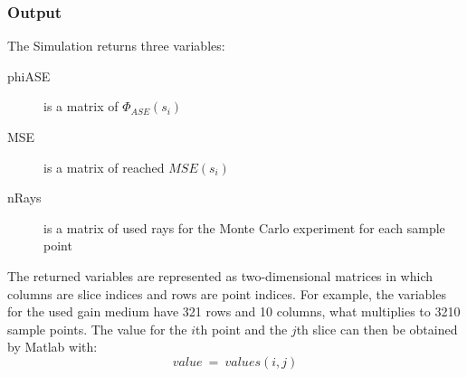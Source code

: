 \subsubsection{Output}
The Simulation returns three variables:
\begin{description}
  \item[phiASE] is a matrix of $\Phi_{ASE}(s_i)$ 
  \item[MSE] is a matrix of reached $MSE(s_i)$
  \item[nRays] is a matrix of used rays for the Monte Carlo experiment for each sample point
    
\end{description}
The returned variables are represented as two-dimensional matrices in 
which columns are slice indices and rows are point indices.
For example, the variables for the used gain
medium have 321 rows and 10 columns, what multiplies to
3210 sample points. The value for the $i$th point and
the $j$th slice can then be obtained by Matlab with:
\[value~=~values(i,j)\]
